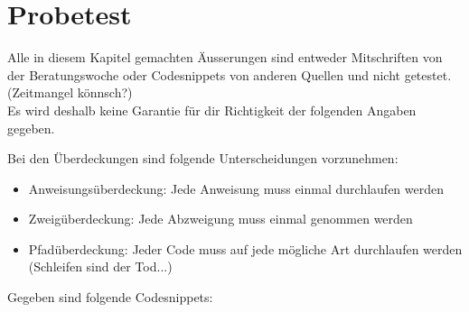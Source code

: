 \section{Probetest}
Alle in diesem Kapitel gemachten Äusserungen sind entweder Mitschriften von der Beratungswoche oder Codesnippets von anderen Quellen und nicht getestet. (Zeitmangel könnsch?)\\
Es wird deshalb keine Garantie für dir Richtigkeit der folgenden Angaben gegeben.

Bei den Überdeckungen sind folgende Unterscheidungen vorzunehmen:
\begin{itemize}
\itemsep0em
\item Anweisungsüberdeckung: Jede Anweisung muss einmal durchlaufen werden
\item Zweigüberdeckung: Jede Abzweigung muss einmal genommen werden
\item Pfadüberdeckung: Jeder Code muss auf jede mögliche Art durchlaufen werden (Schleifen sind der Tod...)
\end{itemize}

Gegeben sind folgende Codesnippets:

\begin{minipage}[t]{0.48\textwidth}

\end{minipage}
\hfill
\begin{minipage}[t]{0.48\textwidth}

\end{minipage}

